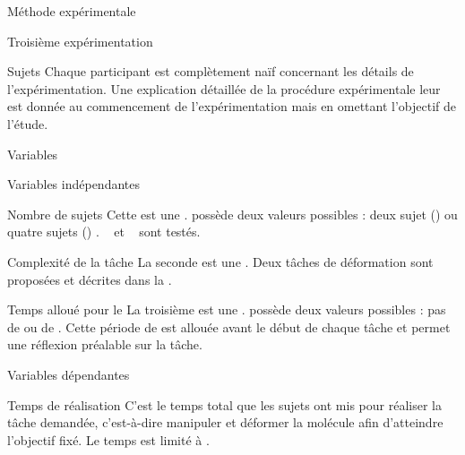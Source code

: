 \documentclass[myfrancais,ngerman,english,frenchb]{mythesis}
\begin{document}
\begin{mychapter}{Méthode expérimentale}
\begin{mysection}{Troisième expérimentation}
\begin{mysubsection}{Sujets}
				Chaque participant est complètement naïf concernant les détails de l'expérimentation.
				Une explication détaillée de la procédure expérimentale leur est donnée au commencement de l'expérimentation mais en omettant l'objectif de l'étude.
			\end{mysubsection}
			\begin{mysubsection}{Variables}
				\begin{mysubsubsection}{Variables indépendantes}
					\begin{myparagraph}{ Nombre de sujets}
						Cette  est une .
						 possède deux valeurs possibles : \og deux sujet (\mycf {}) \fg ou \og quatre sujets (\mycf {}) \fg.
						~ et ~ sont testés.
					\end{myparagraph}
					\begin{myparagraph}{ Complexité de la tâche}
						La seconde  est une .
						Deux tâches de déformation sont proposées et décrites dans la .
					\end{myparagraph}
					\begin{myparagraph}{ Temps alloué pour le \mybrainstorming}
						La troisième  est une .
						 possède deux valeurs possibles : \og pas de \mybrainstorming \fg ou \og {} de \mybrainstorming \fg.
						Cette période de \mybrainstorming est allouée avant le début de chaque tâche et permet une réflexion préalable sur la tâche.
					\end{myparagraph}
				\end{mysubsubsection}
				\begin{mysubsubsection}{Variables dépendantes}
					\begin{myparagraph}{ Temps de réalisation}
						C'est le temps total que les sujets ont mis pour réaliser la tâche demandée, c'est-à-dire manipuler et déformer la molécule afin d'atteindre l'objectif fixé.
						Le temps est limité à .
					\end{myparagraph}

\end{mysubsubsection}
\end{mysubsection}
\end{mysection}
\end{mychapter}
\end{document}
